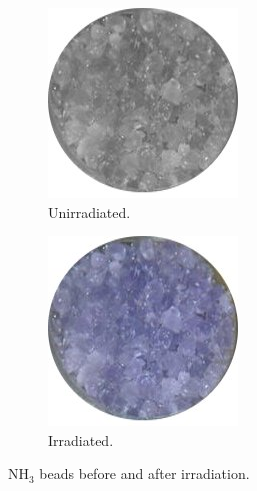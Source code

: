 \begin{figure}[tb!]
  \centering
  \begin{subfigure}[t]{0.2\textwidth}
    \includegraphics[width=\textwidth]{figs/ammonia-unirradiated.jpg}
    \caption{Unirradiated. \label{C5S3SS2F3a}}
  \end{subfigure}
  \qquad
  \begin{subfigure}[t]{0.2\textwidth}
    \includegraphics[width=\textwidth]{figs/ammonia-irradiated.jpg}
    \caption{Irradiated. \label{C5S3SS2F3b}}
  \end{subfigure}
  \caption[NH${}_3$ beads before and after irradiation.]{NH${}_3$ beads before and after irradiation. \label{C5S3SS2F3}}
\end{figure}

